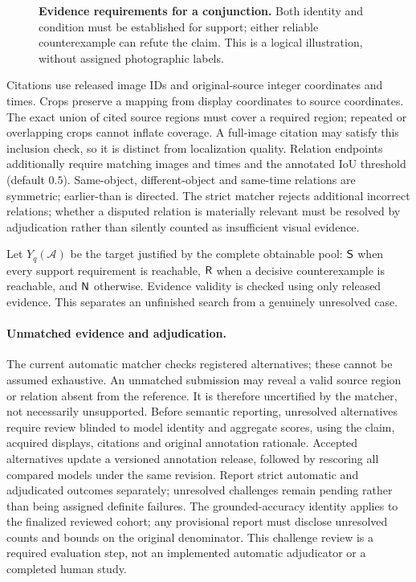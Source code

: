 \begin{figure}[t]
\centering
\resizebox{\linewidth}{!}{}
\caption{\textbf{Evidence requirements for a conjunction.}
Both identity and condition must be established for support; either reliable counterexample can refute the claim.
This is a logical illustration, without assigned photographic labels.}
\label{fig:suppcert}
\end{figure}

Citations use released image IDs and original-source integer coordinates and times.
Crops preserve a mapping from display coordinates to source coordinates.
The exact union of cited source regions must cover a required region; repeated or overlapping crops cannot inflate coverage.
A full-image citation may satisfy this inclusion check, so it is distinct from localization quality.
Relation endpoints additionally require matching images and times and the annotated IoU threshold (default \(0.5\)).
Same-object, different-object and same-time relations are symmetric; earlier-than is directed.
The strict matcher rejects additional incorrect relations; whether a disputed relation is materially relevant must be resolved by adjudication rather than silently counted as insufficient visual evidence.

Let \(Y_q(\mathcal{A})\) be the target justified by the complete obtainable pool: \(\mathsf{S}\) when every support requirement is reachable, \(\mathsf{R}\) when a decisive counterexample is reachable, and \(\mathsf{N}\) otherwise.
Evidence validity is checked using only released evidence.
This separates an unfinished search from a genuinely unresolved case.

\paragraph{Unmatched evidence and adjudication.}
The current automatic matcher checks registered alternatives; these cannot be assumed exhaustive.
An unmatched submission may reveal a valid source region or relation absent from the reference.
It is therefore uncertified by the matcher, not necessarily unsupported.
Before semantic reporting, unresolved alternatives require review blinded to model identity and aggregate scores, using the claim, acquired displays, citations and original annotation rationale.
Accepted alternatives update a versioned annotation release, followed by rescoring all compared models under the same revision.
Report strict automatic and adjudicated outcomes separately; unresolved challenges remain pending rather than being assigned definite failures.
The grounded-accuracy identity applies to the finalized reviewed cohort; any provisional report must disclose unresolved counts and bounds on the original denominator.
This challenge review is a required evaluation step, not an implemented automatic adjudicator or a completed human study.

